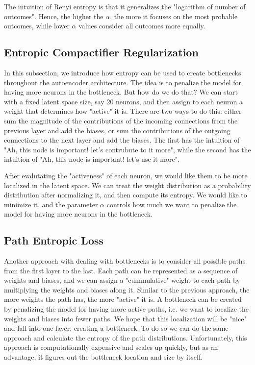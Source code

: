 \documentclass[12pt]{article}
\begin{document}
The intuition of Renyi entropy is that it generalizes the "logarithm of number of outcomes". Hence, the higher the \(\alpha\), the more it focuses on the most probable outcomes, while lower \(\alpha\) values consider all outcomes more equally.

\subsection{Entropic Compactifier Regularization}

In this subsection, we introduce how entropy can be used to create bottlenecks throughout the autoencoder architecture. The idea is to penalize the model for having more neurons in the bottleneck. But how do we do that? We can start with a fixed latent space size, say 20 neurons, and then assign to each neuron a weight that determines how "active" it is. There are two ways to do this: either sum the magnitude of the contributions of the incoming connections from the previous layer and add the biases, or sum the contributions of the outgoing connections to the next layer and add the biases. The first has the intuition of "Ah, this node is important! let's contrubute to it more", while the second has the intuition of "Ah, this node is important! let's use it more".

After evalutating the "activeness" of each neuron, we would like them to be more localized in the latent space. We can treat the weight distribution as a probability distribution after normalizing it, and then compute its entropy. We would like to minimize it, and the parameter \(\alpha\) controls how much we want to penalize the model for having more neurons in the bottleneck.

\subsection{Path Entropic Loss}

Another approach with dealing with bottlenecks is to consider all possible paths from the first layer to the last. Each path can be represented as a sequence of weights and biases, and we can assign a "cummulative" weight to each path by multiplying the weights and biases along it. Similar to the previous approach, the more weights the path has, the more "active" it is. A bottleneck can be created by penalizing the model for having more active paths, i.e. we want to localize the weights and biases into fewer paths. We hope that this localization will be "nice" and fall into one layer, creating a bottleneck. To do so we can do the same approach and calculate the entropy of the path distributions. Unfortunately, this approach is computationally expensive and scales up quickly, but as an advantage, it figures out the bottleneck location and size by itself.
\end{document}
